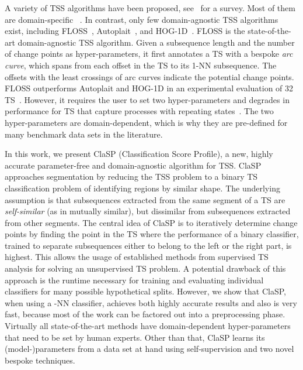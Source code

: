 \documentclass[pdflatex,sn-basic]{sn-jnl}
\begin{document}
A variety of TSS algorithms have been proposed, see~\citep{aminikhanghahi2017survey} for a survey. Most of them are domain-specific ~\citep{brahim2004gaussian, bosc2003automatic, Zenisek2019MachineLB}. In contrast, only few domain-agnostic TSS algorithms exist, including FLOSS~\citep{gharghabi2017matrix}, Autoplait~\citep{matsubara2014autoplait}, and HOG-1D~\citep{zhao2016decomposing}. FLOSS is the state-of-the-art domain-agnostic TSS algorithm. Given a subsequence length and the number of change points as hyper-parameters, it first annotates a TS with a bespoke \emph{arc curve}, which spans from each offset in the TS to its 1-NN subsequence. The offsets with the least crossings of arc curves indicate the potential change points. FLOSS outperforms Autoplait and HOG-1D in an experimental evaluation of 32 TS~\citep{gharghabi2017matrix}. However, it requires the user to set two hyper-parameters and degrades in performance for TS that capture processes with repeating states~\citep{Deldari2020ESPRESSOEA}. The two hyper-parameters are domain-dependent, which is why they are pre-defined for many benchmark data sets in the literature.

In this work, we present ClaSP (Classification Score Profile), a new, highly accurate parameter-free and domain-agnostic algorithm for TSS. ClaSP approaches segmentation by reducing the TSS problem to a binary TS classification problem of identifying regions by similar shape. The underlying assumption is that subsequences extracted from the same segment of a TS are \emph{self-similar} (as in mutually similar), but dissimilar from subsequences extracted from other segments. The central idea of ClaSP is to iteratively determine change points by finding the point in the TS where the performance of a binary classifier, trained to separate subsequences either to belong to the left or the right part, is highest. This allows the usage of established methods from supervised TS analysis for solving an unsupervised TS problem. A potential drawback of this approach is the runtime necessary for training and evaluating individual classifiers for many possible hypothetical splits. However, we show that ClaSP, when using a -NN classifier, achieves both highly accurate results and also is very fast, because most of the work can be factored out into a preprocessing phase. Virtually all state-of-the-art methods have domain-dependent hyper-parameters that need to be set by human experts. Other than that, ClaSP learns its (model-)parameters from a data set at hand using self-supervision and two novel bespoke techniques.
\end{document}
